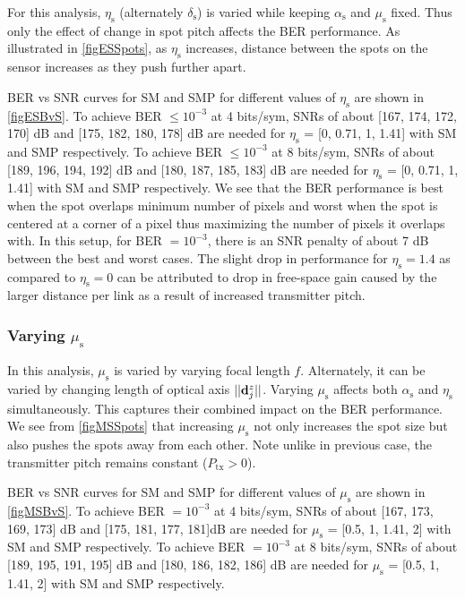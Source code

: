 For this analysis, $\eta_{\text{s}}$ (alternately $\delta_{\text{s}}$) is varied while keeping $\alpha_{\text{s}}$ and $\mu_{\text{s}}$ fixed. Thus only the effect of change in spot pitch affects the BER performance. As illustrated in \figurename{ \ref{figESSpots}}, as $\eta_{\text{s}}$ increases, distance between the spots on the sensor increases as they push further apart.

BER vs SNR curves for SM and SMP for different values of $\eta_{\text{s}}$ are shown in \figurename{ \ref{figESBvS}}. To achieve BER $\leq 10^{-3}$ at 4 bits/sym, SNRs of about [167, 174, 172, 170] dB and [175, 182, 180, 178] dB are needed for $\eta_{\text{s}}$ = [0, 0.71, 1, 1.41] with SM and SMP respectively. To achieve BER $\leq 10^{-3}$ at 8 bits/sym, SNRs of about [189, 196, 194, 192] dB and [180, 187, 185, 183] dB are needed for $\eta_{\text{s}}$ = [0, 0.71, 1, 1.41] with SM and SMP respectively. We see that the BER performance is best when the spot overlaps minimum number of pixels and worst when the spot is centered at a corner of a pixel thus maximizing the number of pixels it overlaps with. In this setup, for BER $=10^{-3}$, there is an SNR penalty of about 7 dB between the best and worst cases. The slight drop in performance for $\eta_{\text{s}}=1.4$ as compared to $\eta_{\text{s}}=0$ can be attributed to drop in free-space gain caused by the larger distance per link as a result of increased transmitter pitch.

\subsubsection{Varying $\mu_{\text{s}}$}
\label{subsubsec:osmResultsMu}
In this analysis, $\mu_{\text{s}}$ is varied by varying focal length $f$. Alternately, it can be varied by changing length of optical axis $||{\bf{d}}^{z}_{j}||$. Varying $\mu_{\text{s}}$ affects both $\alpha_{\text{s}}$ and $\eta_{\text{s}}$ simultaneously. This captures their combined impact on the BER performance. We see from \figurename{ \ref{figMSSpots}} that increasing $\mu_{\text{s}}$ not only increases the spot size but also pushes the spots away from each other. Note unlike in previous case, the transmitter pitch remains constant ($P_{\text{tx}}>0$).

BER vs SNR curves for SM and SMP for different values of $\mu_{\text{s}}$ are shown in \figurename{ \ref{figMSBvS}}. To achieve BER $=10^{-3}$ at 4 bits/sym, SNRs of about [167, 173, 169, 173] dB and [175, 181, 177, 181]dB are needed for $\mu_{\text{s}}$ = [0.5, 1, 1.41, 2] with SM and SMP respectively. To achieve BER $=10^{-3}$ at 8 bits/sym, SNRs of about [189, 195, 191, 195] dB and [180, 186, 182, 186] dB are needed for $\mu_{\text{s}}$ = [0.5, 1, 1.41, 2] with SM and SMP respectively.

